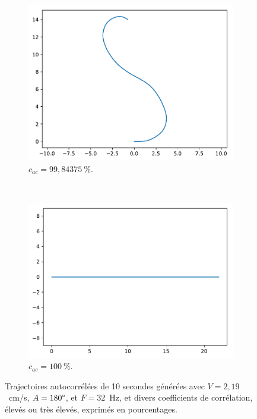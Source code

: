 \begin{appendices}
\begin{figure}[htb]
\begin{subfigure}[t]{\subImgWarea}
			\includegraphics[width=\textwidth]{figures/ch3/2_19_autocorr_2_19_180_32_0_9984375}
			\caption{$c_{ac} = 99,84375~\%$.}
			\label{fig:2_19_autocorr_2_19_180_32_0_9984375}
		\end{subfigure}
		~
		\begin{subfigure}[t]{\subImgWarea}
			\centering
			\includegraphics[width=\textwidth]{figures/ch3/2_19_autocorr_2_19_180_32_1_0}
			\caption{$c_{ac} = 100~\%$.}
			\label{fig:2_19_autocorr_2_19_180_32_1_0}
		\end{subfigure}
		\caption[Trajectoires autocorrélées -- II]{Trajectoires autocorrélées de 10 secondes générées avec $V = 2,19$~cm/s, $A = 180\degree$, et $F = 32$~Hz, et divers coefficients de corrélation, élevés ou très élevés, exprimés en pourcentages.}
		\label{fig:realAutocorr2}
	\end{figure}


\end{appendices}
